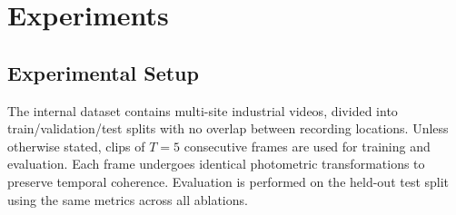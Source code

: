 \documentclass{article}
\begin{document}
\section{Experiments}
\label{sec:experiments}

\subsection{Experimental Setup}

The internal dataset contains multi-site industrial videos, divided into train/validation/test splits with no overlap between recording locations. 
Unless otherwise stated, clips of $T{=}5$ consecutive frames are used for training and evaluation. 
Each frame undergoes identical photometric transformations to preserve temporal coherence. 
Evaluation is performed on the held-out test split using the same metrics across all ablations.




\end{document}
